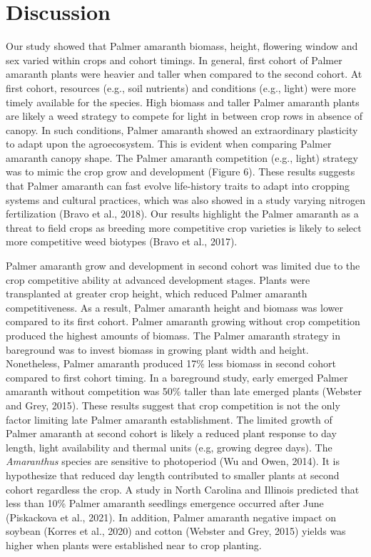 \documentclass[utf8]{frontiersSCNS}
\begin{document}
\hypertarget{discussion}{%
\section*{Discussion}\label{discussion}}

Our study showed that Palmer amaranth biomass, height, flowering window
and sex varied within crops and cohort timings. In general, first cohort
of Palmer amaranth plants were heavier and taller when compared to the
second cohort. At first cohort, resources (e.g., soil nutrients) and
conditions (e.g., light) were more timely available for the species.
High biomass and taller Palmer amaranth plants are likely a weed
strategy to compete for light in between crop rows in absence of canopy.
In such conditions, Palmer amaranth showed an extraordinary plasticity
to adapt upon the agroecosystem. This is evident when comparing Palmer
amaranth canopy shape. The Palmer amaranth competition (e.g., light)
strategy was to mimic the crop grow and development (Figure 6). These
results suggests that Palmer amaranth can fast evolve life-history
traits to adapt into cropping systems and cultural practices, which was
also showed in a study varying nitrogen fertilization (Bravo et al.,
2018). Our results highlight the Palmer amaranth as a threat to field
crops as breeding more competitive crop varieties is likely to select
more competitive weed biotypes (Bravo et al., 2017).

Palmer amaranth grow and development in second cohort was limited due to
the crop competitive ability at advanced development stages. Plants were
transplanted at greater crop height, which reduced Palmer amaranth
competitiveness. As a result, Palmer amaranth height and biomass was
lower compared to its first cohort. Palmer amaranth growing without crop
competition produced the highest amounts of biomass. The Palmer amaranth
strategy in bareground was to invest biomass in growing plant width and
height. Nonetheless, Palmer amaranth produced 17\% less biomass in
second cohort compared to first cohort timing. In a bareground study,
early emerged Palmer amaranth without competition was 50\% taller than
late emerged plants (Webster and Grey, 2015). These results suggest that
crop competition is not the only factor limiting late Palmer amaranth
establishment. The limited growth of Palmer amaranth at second cohort is
likely a reduced plant response to day length, light availability and
thermal units (e.g, growing degree days). The \emph{Amaranthus} species
are sensitive to photoperiod (Wu and Owen, 2014). It is hypothesize that
reduced day length contributed to smaller plants at second cohort
regardless the crop. A study in North Carolina and Illinois predicted
that less than 10\% Palmer amaranth seedlings emergence occurred after
June (Piskackova et al., 2021). In addition, Palmer amaranth negative
impact on soybean (Korres et al., 2020) and cotton (Webster and Grey,
2015) yields was higher when plants were established near to crop
planting.
\end{document}
